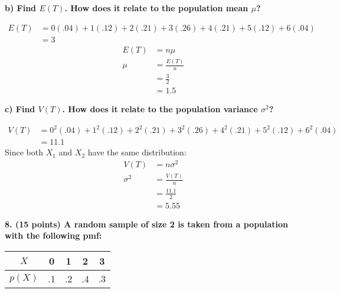 \documentclass[12pt, letter]{article}
\begin{document}
\qquad \textbf{b) Find $E(T)$. How does it relate to the population mean $\mu$?}
\begin{center}
	\begin{align*}
		E(T) &= 0(.04) + 1(.12) + 2(.21) + 3(.26) + 4(.21) + 5(.12) + 6(.04) \\
		&= \boxed{3}
	\end{align*}
	\begin{align*}
		E(T) &= n \mu \\
		\mu &= \frac{E(T)}{n} \\
		&= \frac{3}{2} \\
		&= \boxed{1.5}
	\end{align*}
\end{center}

\qquad \textbf{c) Find $V(T)$. How does it relate to the population variance $\sigma^{2}$?}
\begin{center}
	\begin{align*}
		V(T) &= 0^{2}(.04) + 1^{2}(.12) + 2^{2}(.21) + 3^{2}(.26) + 4^{2}(.21) + 5^{2}(.12) + 6^{2}(.04) \\
		&= \boxed{11.1}
	\end{align*}
	Since both $X_{1}$ and $X_{2}$ have the same distribution:
	\begin{align*}
		V(T) &= n \sigma^{2} \\
		\sigma^{2} &= \frac{V(T)}{n} \\
		&= \frac{11.1}{2} \\
		&= \boxed{5.55}
	\end{align*}
\end{center}

\textbf{8. (15 points) A random sample of size 2 is taken from a population with the following pmf:}
\begin{center}
	\def\arraystretch{1.2}
	\begin{tabular}{|c|c|c|c|c|}
		\hline
		$X$ & 0 & 1 & 2 & 3 \\
		\hline
		$p(X)$ & .1 & .2 & .4 & .3 \\
		\hline
	\end{tabular}
\end{center}
\end{document}
